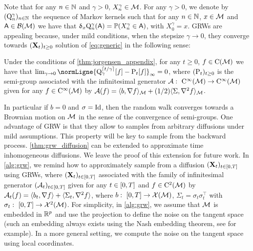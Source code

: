 Note that for any $n \in \mathbb{N}$ and $\gamma >0$, $X_n^\gamma \in \mathcal M$.  For any
$\gamma>0$, we denote by $(\mathrm{Q}_n^{\gamma})_{n \in \mathbb{N}}$ the sequence of
Markov kernels such that for any $n \in \mathbb{N}$, $x \in \mathcal M$ and
$\mathsf{A} \in \mathcal{B}(\mathcal M)$ we have that
$\updelta_x \mathrm{Q}_n^\gamma(\mathsf{A}) = \mathbb{P}(X_n^\gamma \in \mathsf{A})$, with
$X_0^\gamma = x$.  GRWs are appealing because, under mild conditions, when the
stepsize $\gamma \to 0$, they converge towards $(\mathbf{X}_t)_{t \geq 0}$ solution of
\eqref{eq:generic} in the following sense:

\begin{theorem}
  \label{thm:grw_diffusion}
  Under the conditions of \cref{thm:jorgensen_appendix}, for any $t \geq 0$,
  $f \in \mathrm{C}(\mathcal M)$  we have that
  $\lim_{\gamma \to 0} \normLigne{ \Qker_{\gamma}^{\ceil{t/\gamma}}[f] -
    \Pker_t[f]}_{\infty} = 0$, where $(\mathrm{P}_t)_{t \geq 0}$ is the
  semi-group associated with the infinitesimal generator
  $\mathcal{A}: \ \mathrm{C}^\infty(\mathcal M) \to \mathrm{C}^\infty(\mathcal M)$ given for any
  $f \in \mathrm{C}^\infty(\mathcal M)$ by
  $\mathcal{A}(f) = \langle b, \nabla f \rangle_{\mathcal M} + (1/2) \langle
  \Sigma, \nabla^2f \rangle_{\mathcal M}$.
\end{theorem}   

In particular if $b = 0$ and $\sigma = \operatorname{Id}$, then the random walk
converges towards a Brownian motion on $\mathcal M$ in the sense of the convergence
of semi-groups.
One advantage of GRW is that they allow to samples from arbitrary diffusions
under mild assumptions. This property will be key to sample from the backward
process. \cref{thm:grw_diffusion} can be extended to approximate time
inhomogeneous diffusions. We leave the proof of this extension for future
work. In \cref{alg:grw}, we remind how to approximately sample from a diffusion
$(\mathbf{X}_t)_{t \in \left[0,T\right]}$ using GRWs, where $(\mathbf{X}_t)_{t \in \left[0,T\right]}$
associated with the family of infinitesimal generator
$(\mathcal{A}_t)_{t \in \left[0,T\right]}$ given for any $t \in \left[0,T\right]$ and
$f \in \mathrm{C}^2(\mathcal M)$ by
$\mathcal{A}_t(f) = \langle b_t, \nabla f \rangle + \langle \Sigma_t, \nabla^2 f
\rangle$, where $b: \ \left[0,T\right] \to \mathcal{X}(\mathcal{M})$, $\Sigma_t = \sigma_t \sigma_t^\top$
with $\sigma_t : \ \left[0,T\right] \to \mathcal{X}^2(\mathcal{M})$. For simplicity, in \cref{alg:grw},
we assume that $\mathcal M$ is embedded in $\mathbb{R}^p$ and use the projection to define
the noise on the tangent space (such an embedding always exists using the Nash
embedding theorem, see \cite{gunther1991isometric} for example).  In a more
general setting, we compute the noise on the tangent space using local
coordinates.


